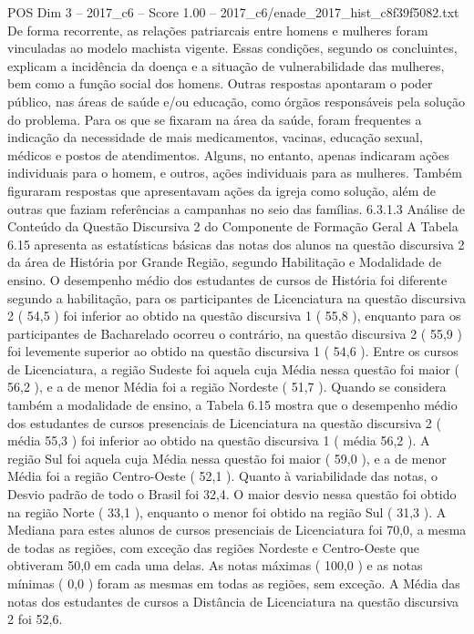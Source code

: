 \begin{textsample}{POS Dim 3 – 2017\_c6 – Score 1.00 – 2017\_c6/enade\_2017\_hist\_c8f39f5082.txt}
De forma recorrente, as relações patriarcais entre homens e mulheres foram vinculadas ao modelo machista vigente.
Essas condições, segundo os concluintes, explicam a incidência da doença e a situação de vulnerabilidade das mulheres, bem como a função social dos homens.
Outras respostas apontaram o poder público, nas áreas de saúde e/ou educação, como órgãos responsáveis pela solução do problema.
Para os que se fixaram na área da saúde, foram frequentes a indicação da necessidade de mais medicamentos, vacinas, educação sexual, médicos e postos de atendimentos.
Alguns, no entanto, apenas indicaram ações individuais para o homem, e outros, ações individuais para as mulheres.
Também figuraram respostas que apresentavam ações da igreja como solução, além de outras que faziam referências a campanhas no seio das famílias. 6.3.1.3 Análise de Conteúdo da Questão Discursiva 2 do Componente de Formação Geral A Tabela 6.15 apresenta as estatísticas básicas das notas dos alunos na questão discursiva 2 da área de História por Grande Região, segundo Habilitação e Modalidade de ensino.
O desempenho médio dos estudantes de cursos de História foi diferente segundo a habilitação, para os participantes de Licenciatura na questão discursiva 2 ( 54,5 ) foi inferior ao obtido na questão discursiva 1 ( 55,8 ), enquanto para os participantes de Bacharelado ocorreu o contrário, na questão discursiva 2 ( 55,9 ) foi levemente superior ao obtido na questão discursiva 1 ( 54,6 ).
Entre os cursos de Licenciatura, a região Sudeste foi aquela cuja Média nessa questão foi maior ( 56,2 ), e a de menor Média foi a região Nordeste ( 51,7 ).
Quando se considera também a modalidade de ensino, a Tabela 6.15 mostra que o desempenho médio dos estudantes de cursos presenciais de Licenciatura na questão discursiva 2 ( média 55,3 ) foi inferior ao obtido na questão discursiva 1 ( média 56,2 ).
A região Sul foi aquela cuja Média nessa questão foi maior ( 59,0 ), e a de menor Média foi a região Centro-Oeste ( 52,1 ).
Quanto à variabilidade das notas, o Desvio padrão de todo o Brasil foi 32,4.
O maior desvio nessa questão foi obtido na região Norte ( 33,1 ), enquanto o menor foi obtido na região Sul ( 31,3 ).
A Mediana para estes alunos de cursos presenciais de Licenciatura foi 70,0, a mesma de todas as regiões, com exceção das regiões Nordeste e Centro-Oeste que obtiveram 50,0 em cada uma delas.
As notas máximas ( 100,0 ) e as notas mínimas ( 0,0 ) foram as mesmas em todas as regiões, sem exceção.
A Média das notas dos estudantes de cursos a Distância de Licenciatura na questão discursiva 2 foi 52,6.

\end{textsample}
